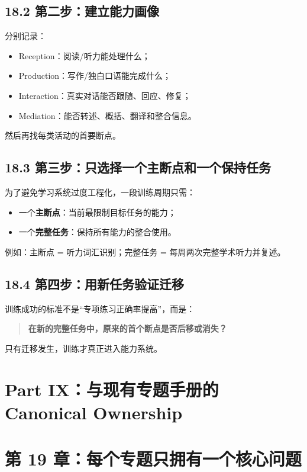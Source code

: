 \documentclass[11pt,a4paper]{ctexart}
\newcommand{\kw}[1]{\textbf{#1}}
\begin{document}
\subsection{18.2 第二步：建立能力画像}
分别记录：
\begin{itemize}
  \item Reception：阅读/听力能处理什么；
  \item Production：写作/独白口语能完成什么；
  \item Interaction：真实对话能否跟随、回应、修复；
  \item Mediation：能否转述、概括、翻译和整合信息。
\end{itemize}
然后再找每类活动的首要断点。

\subsection{18.3 第三步：只选择一个主断点和一个保持任务}
为了避免学习系统过度工程化，一段训练周期只需：
\begin{itemize}
  \item 一个\kw{主断点}：当前最限制目标任务的能力；
  \item 一个\kw{完整任务}：保持所有能力的整合使用。
\end{itemize}
例如：主断点 = 听力词汇识别；完整任务 = 每周两次完整学术听力并复述。

\subsection{18.4 第四步：用新任务验证迁移}
训练成功的标准不是“专项练习正确率提高”，而是：
\begin{quote}
\kw{在新的完整任务中，原来的首个断点是否后移或消失？}
\end{quote}
只有迁移发生，训练才真正进入能力系统。

\newpage
\section{Part IX：与现有专题手册的 Canonical Ownership}

\section{第 19 章：每个专题只拥有一个核心问题}
\end{document}
